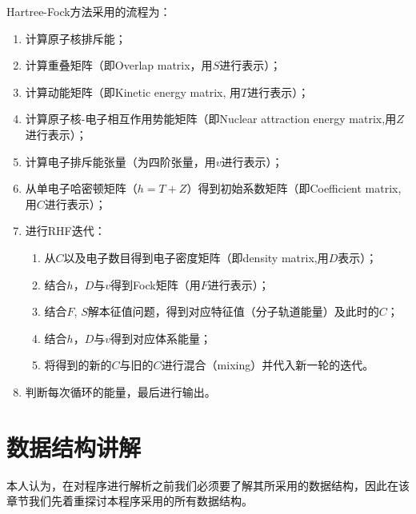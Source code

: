 \documentclass[12pt,a4paper,openany,twoside]{article}
\numberwithin{equation}{section}
\begin{document}
            Hartree-Fock方法采用的流程为：
            \begin{enumerate}
                \item 计算原子核排斥能；
                \item 计算重叠矩阵（即Overlap matrix，用$S$进行表示）；
                \item 计算动能矩阵（即Kinetic energy matrix, 用$T$进行表示）；
                \item 计算原子核-电子相互作用势能矩阵（即Nuclear attraction energy matrix,用$Z$进行表示）；
                \item 计算电子排斥能张量（为四阶张量，用$v$进行表示）；
                \item 从单电子哈密顿矩阵（$h = T+Z$）得到初始系数矩阵（即Coefficient matrix, 用$C$进行表示）；
                \item 进行RHF迭代：
                    \begin{enumerate}
                        \item 从$C$以及电子数目得到电子密度矩阵（即density matrix,用$D$表示）；
                        \item 结合$h$，$D$与$v$得到Fock矩阵（用$F$进行表示）；
                        \item 结合$F$, $S$解本征值问题，得到对应特征值（分子轨道能量）及此时的$C$；
                        \item 结合$h$，$D$与$v$得到对应体系能量；
                        \item 将得到的新的$C$与旧的$C$进行混合（mixing）并代入新一轮的迭代。
                    \end{enumerate}
                \item 判断每次循环的能量，最后进行输出。
            \end{enumerate}
        \section{数据结构讲解}
        本人认为，在对程序进行解析之前我们必须要了解其所采用的数据结构，因此在该章节我们先着重探讨本程序采用的所有数据结构。
\end{document}

